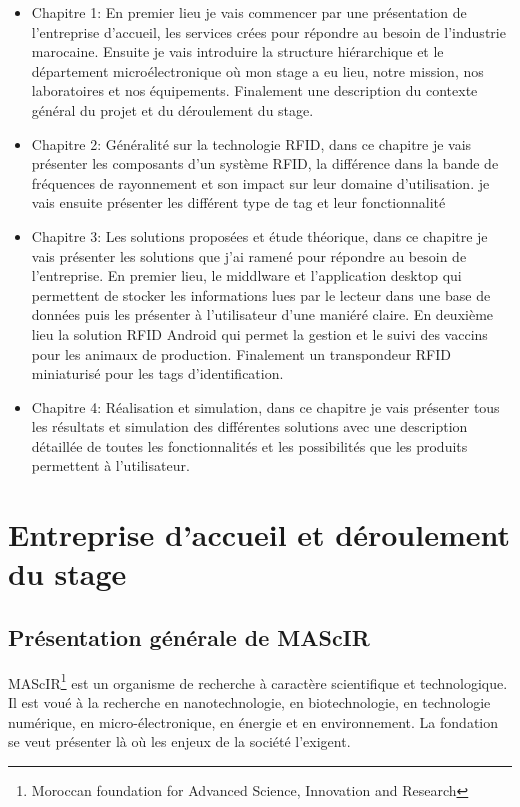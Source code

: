 \documentclass[11pt, a4paper, twoside]{book}
\begin{document}
\begin{itemize}
\item Chapitre 1: En premier lieu je vais commencer par une présentation de l'entreprise d'accueil, les services crées pour répondre au besoin de l'industrie marocaine. Ensuite je vais introduire la structure hiérarchique et le département microélectronique où mon stage a eu lieu, notre mission, nos laboratoires et nos équipements. Finalement une description du contexte général du projet et du déroulement du stage.

\item Chapitre 2: Généralité sur la technologie RFID, dans ce chapitre je vais  présenter les composants d'un système RFID, la différence dans la bande de fréquences de rayonnement et son impact sur leur domaine d'utilisation. je vais ensuite présenter les différent type de tag et leur fonctionnalité

\item Chapitre 3: Les solutions proposées et étude théorique, dans ce chapitre je vais présenter les solutions que j'ai ramené pour répondre au besoin de l'entreprise. En premier lieu, le middlware et l'application desktop qui permettent de stocker les informations lues par le lecteur dans une base de données puis les présenter à l'utilisateur d'une maniéré claire. En deuxième lieu la solution RFID Android qui permet la gestion et le suivi des vaccins pour les animaux de production. Finalement un transpondeur RFID miniaturisé pour les tags d'identification.

\item Chapitre 4: Réalisation et simulation, dans ce chapitre je vais présenter tous les résultats et simulation des différentes solutions avec une description détaillée de toutes les fonctionnalités et les possibilités que les produits permettent à l'utilisateur.
\end{itemize}

\pagestyle{plain}

\chapter{Entreprise d'accueil et déroulement du stage}
\pagestyle{headings}
\section{Présentation générale de MAScIR}
MAScIR\footnote{Moroccan foundation for Advanced Science, Innovation and Research} est un organisme de recherche à caractère scientifique et technologique. Il est voué à la recherche en nanotechnologie, en biotechnologie, en technologie numérique, en micro-électronique, en énergie et en environnement. La fondation se veut présenter là où les enjeux de la société l’exigent.\\
\end{document}
